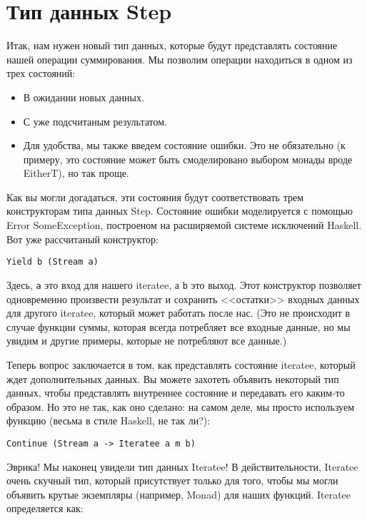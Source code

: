 \section{Тип данных Step}

Итак, нам нужен новый тип данных, которые будут представлять состояние нашей операции суммирования. Мы позволим операции находиться в одном из трех состояний:

\begin{itemize}
\item В ожидании новых данных.
\item С уже подсчитаным результатом.
\item Для удобства, мы также введем состояние ошибки. Это не обязательно (к примеру, это состояние может быть смоделировано выбором монады вроде EitherT), но так проще.
\end{itemize}

Как вы могли догадаться, эти состояния будут соответствовать трем конструкторам типа данных Step. Состояние ошибки моделируется с помощью Error SomeException, построеном на расширяемой системе исключений Haskell. Вот уже рассчитаный конструктор:

\begin{lstlisting}
Yield b (Stream a)
\end{lstlisting}

Здесь, \lstinline'a' это вход для нашего iteratee, а \lstinline'b' это выход. Этот конструктор позволяет одновременно произвести результат и сохранить <<остатки>> входных данных для другого iteratee, который может работать после нас. (Это не происходит в случае функции суммы, которая всегда потребляет все входные данные, но мы увидим и другие примеры, которые не потребляют все данные.)

Теперь вопрос заключается в том, как представлять состояние iteratee, который ждет дополнительных данных. Вы можете захотеть объявить некоторый тип данных, чтобы представлять внутреннее состояние и передавать его каким-то образом. Но это не так, как оно сделано: на самом деле, мы просто используем функцию (весьма в стиле Haskell, не так ли?):

\begin{lstlisting}
Continue (Stream a -> Iteratee a m b)
\end{lstlisting}

Эврика! Мы наконец увидели тип данных Iteratee! В действительности, Iteratee очень скучный тип, который присутствует только для того, чтобы мы могли объявить крутые экземпляры (например, Monad) для наших функций. Iteratee определяется как:

